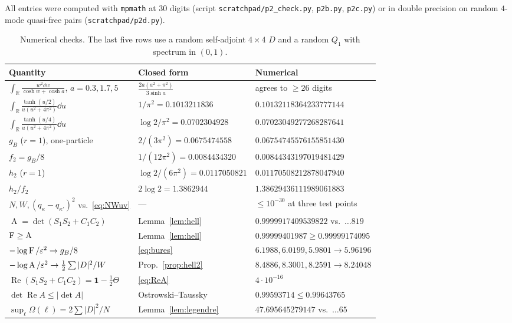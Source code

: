 \documentclass[11pt]{article}
\newcommand{\one}{\mathbf 1}
\newcommand{\Hell}{\operatorname{A}}
\theoremstyle{definition}\newtheorem{problem}[theorem]{Problem}
\begin{document}
All entries were computed with \texttt{mpmath} at \(30\) digits (script
\texttt{scratchpad/p2\_check.py}, \texttt{p2b.py}, \texttt{p2c.py}) or in double precision on random
\(4\)-mode quasi-free pairs (\texttt{scratchpad/p2d.py}).

\begin{table}[h]\centering\footnotesize
\begin{tabular}{p{}p{}p{}}\toprule
Quantity & Closed form & Numerical\\\midrule
\(\int_{\mathbb R}\frac{w^2\dd w}{\cosh w+\cosh a}\), \(a=0.3,1.7,5\) & \(\frac{2a(a^2+\pi^2)}{3\sinh a}\) & agrees to \(\ge26\) digits\\
\(\int_{\mathbb R}\frac{\tanh(u/2)}{u(u^2+4\pi^2)}\dd u\) & \(1/\pi^2=0.1013211836\) & \(0.10132118364233777144\)\\
\(\int_{\mathbb R}\frac{\tanh(u/4)}{u(u^2+4\pi^2)}\dd u\) & \(\log2/\pi^2=0.0702304928\) & \(0.07023049277268287641\)\\
\(g_B\) (\(r=1\)), one-particle & \(2/(3\pi^2)=0.0675474558\) & \(0.06754745576155851430\)\\
\(f_2=g_B/8\) & \(1/(12\pi^2)=0.0084434320\) & \(0.00844343197019481429\)\\
\(h_2\) (\(r=1\)) & \(\log2/(6\pi^2)=0.0117050821\) & \(0.01170508212878047940\)\\
\(h_2/f_2\) & \(2\log2=1.3862944\) & \(1.38629436111989061883\)\\
\(N,W,(q_\kappa-q_{\kappa'})^2\) vs.\ \eqref{eq:NWuv} & --- & \(\le10^{-30}\) at three test points\\
\(\Hell=\det(S_1S_2+C_1C_2)\) & Lemma~\ref{lem:hell} & \(0.9999917409539822\) vs.\ \(\dots819\)\\
\(\Fid\ge\Hell\) & Lemma~\ref{lem:hell} & \(0.99999401987\ge0.99999174095\)\\
\(-\log\operatorname{F}/\varepsilon^2\to g_B/8\) & \eqref{eq:bures} & \(6.1988,6.0199,5.9801\to5.96196\)\\
\(-\log\Hell/\eps^2\to\frac12\sum|D|^2/W\) & Prop.~\ref{prop:hell2} & \(8.4886,8.3001,8.2591\to8.24048\)\\
\(\operatorname{Re}(S_1S_2+C_1C_2)=\one-\frac12\Theta\) & \eqref{eq:ReA} & \(4\cdot10^{-16}\)\\
\(\det\operatorname{Re}A\le|\det A|\) & Ostrowski--Taussky & \(0.99593714\le0.99643765\)\\
\(\sup_\ell\Omega(\ell)=2\sum|D|^2/N\) & Lemma~\ref{lem:legendre} & \(47.695645279147\) vs.\ \(\dots65\)\\
\bottomrule\end{tabular}
\caption{Numerical checks.  The last five rows use a random self-adjoint \(4\times4\) \(D\) and a
random \(Q_1\) with spectrum in \((0,1)\).}\label{tab:num}
\end{table}
\end{document}
